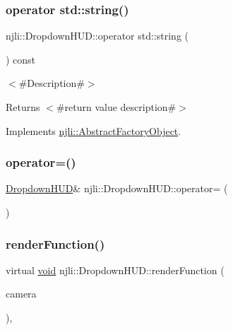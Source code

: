 \subsubsection{\texorpdfstring{operator std\+::string()}{operator std::string()}}
{\footnotesize\ttfamily njli\+::\+Dropdown\+H\+U\+D\+::operator std\+::string (\begin{DoxyParamCaption}{ }\end{DoxyParamCaption}) const\hspace{0.3cm}{\ttfamily [virtual]}}

$<$\#\+Description\#$>$

\begin{DoxyReturn}{Returns}
$<$\#return value description\#$>$ 
\end{DoxyReturn}


Implements \mbox{\hyperlink{classnjli_1_1_abstract_factory_object_a838f4fa7e65cace6098aab5222892942}{njli\+::\+Abstract\+Factory\+Object}}.

\mbox{\label{classnjli_1_1_dropdown_h_u_d_acbfbdf4a4fcacb1d26d2c750fe7386e7}} 
\subsubsection{\texorpdfstring{operator=()}{operator=()}}
{\footnotesize\ttfamily \mbox{\hyperlink{classnjli_1_1_dropdown_h_u_d}{Dropdown\+H\+UD}}\& njli\+::\+Dropdown\+H\+U\+D\+::operator= (\begin{DoxyParamCaption}\item[{const \mbox{\hyperlink{classnjli_1_1_dropdown_h_u_d}{Dropdown\+H\+UD}} \&}]{ }\end{DoxyParamCaption})\hspace{0.3cm}{\ttfamily [protected]}}

\mbox{\label{classnjli_1_1_dropdown_h_u_d_a69bfd903a2b1d0881f9269679621e050}} 
\subsubsection{\texorpdfstring{render\+Function()}{renderFunction()}}
{\footnotesize\ttfamily virtual \mbox{\hyperlink{_thread_8h_af1e856da2e658414cb2456cb6f7ebc66}{void}} njli\+::\+Dropdown\+H\+U\+D\+::render\+Function (\begin{DoxyParamCaption}\item[{\mbox{\hyperlink{classnjli_1_1_camera}{Camera}} $\ast$}]{camera }\end{DoxyParamCaption})\hspace{0.3cm}{\ttfamily [protected]}, {\ttfamily [virtual]}}



